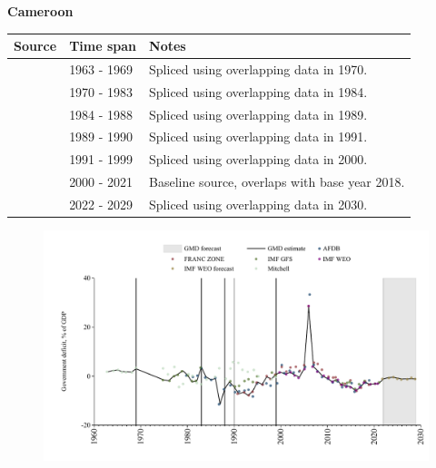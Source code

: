\documentclass[12pt,a4paper,landscape]{article}
\begin{document}
\begin{adjustbox}{max totalsize={\paperwidth}{\paperheight},center}
\begin{minipage}[t][\textheight][t]{\textwidth}
\vspace*{0.5cm}
{}
\begin{center}
{\Large\bfseries Cameroon}
\end{center}
\vspace{0.5cm}
\begin{table}[H]
\centering
\small
\begin{tabular}{|l|l|l|}
\hline
\textbf{Source} & \textbf{Time span} & \textbf{Notes} \\
\hline
\rowcolor{white}\cite{Mitchell}& 1963 - 1969 &Spliced using overlapping data in 1970.\\
\rowcolor{lightgray}\cite{IMF_GFS}& 1970 - 1983 &Spliced using overlapping data in 1984.\\
\rowcolor{white}\cite{AFDB}& 1984 - 1988 &Spliced using overlapping data in 1989.\\
\rowcolor{lightgray}\cite{IMF_GFS}& 1989 - 1990 &Spliced using overlapping data in 1991.\\
\rowcolor{white}\cite{FRANC_ZONE}& 1991 - 1999 &Spliced using overlapping data in 2000.\\
\rowcolor{lightgray}\cite{IMF_WEO}& 2000 - 2021 &Baseline source, overlaps with base year 2018.\\
\rowcolor{white}\cite{IMF_WEO_forecast}& 2022 - 2029 &Spliced using overlapping data in 2030.\\
\hline
\end{tabular}
\end{table}
\begin{figure}[H]
\centering
\includegraphics[width=\textwidth,height=0.6\textheight,keepaspectratio]{graphs/CMR_govdef_GDP.pdf}
\end{figure}
\end{minipage}
\end{adjustbox}
\end{document}
